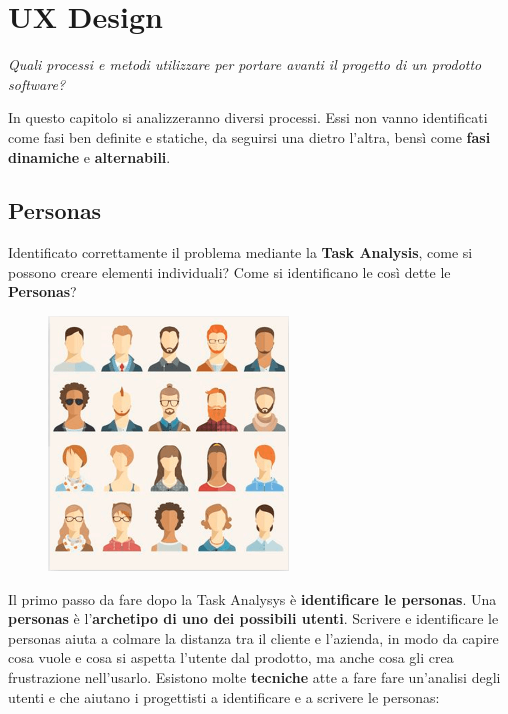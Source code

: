 



\chapter{UX Design}
\begin{flushleft}
	\textit{Quali processi e metodi utilizzare per portare avanti il progetto di un
		prodotto software?}
\end{flushleft}

In questo capitolo si analizzeranno diversi processi.
Essi non vanno identificati come fasi ben definite e statiche, da seguirsi una dietro l'altra, bensì come \textbf{fasi} \textbf{dinamiche} e \textbf{alternabili}.

\section{Personas}
Identificato correttamente il problema mediante la \textbf{Task Analysis}, come si  possono creare elementi individuali? Come si identificano le così dette le \textbf{Personas}?

\begin{figure}[!h]
	\centering
	\includegraphics[scale=0.55]{immagini/Personas.png}
\end{figure}

Il primo passo da fare dopo la Task Analysys è \textbf{identificare le personas}.
Una \textbf{personas} è l'\textbf{archetipo di uno dei possibili utenti}. Scrivere e
identificare le personas aiuta a colmare la distanza tra il cliente e l'azienda, in modo da capire cosa vuole e cosa si aspetta l'utente dal prodotto, ma anche cosa gli crea frustrazione nell'usarlo. Esistono molte \textbf{tecniche} atte a fare fare un'analisi degli utenti e che aiutano i progettisti a identificare e a scrivere le personas:

